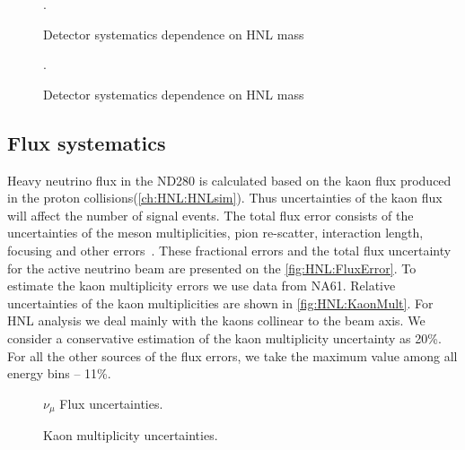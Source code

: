 \documentclass[../main.tex]{subfiles}
\begin{document}
\begin{figure}[!ht]
  \begin{minipage}{0.49\linewidth}
  \end{minipage}
  \begin{minipage}{0.49\linewidth}
  \end{minipage}
  \caption{Detector systematics dependence on HNL mass}.
  \label{fig:HNL:sys}
\end{figure}

\begin{figure}[!ht]
  \caption{Detector systematics dependence on HNL mass}.
  \label{fig:HNL:sysDimuon}
\end{figure}


\subsection{Flux systematics}

Heavy neutrino flux in the ND280 is calculated based on the kaon flux produced in the proton collisions(\autoref{ch:HNL:HNLsim}). Thus uncertainties of the kaon flux will affect the number of signal events. The total flux error consists of the uncertainties of the meson multiplicities, pion re-scatter, interaction length, focusing and other errors~\cite{Abe2013}. These fractional errors and the total flux uncertainty for the active neutrino beam are presented on the \autoref{fig:HNL:FluxError}. To estimate the kaon multiplicity errors we use data from NA61. Relative uncertainties of the kaon multiplicities are shown in \autoref{fig:HNL:KaonMult}. For HNL analysis we deal mainly with the kaons collinear to the beam axis. We consider a conservative estimation of the kaon multiplicity uncertainty as 20\%. For all the other sources of the flux errors, we take the maximum value among all energy bins -- 11\%.

\begin{figure}[!ht]
\begin{minipage}{0.49\linewidth}
  \caption{$\nu_\mu$ Flux uncertainties.}
  \label{fig:HNL:FluxError}
\end{minipage}
\hfill
\begin{minipage}{0.49\linewidth}
  \caption{Kaon multiplicity uncertainties.}
  \label{fig:HNL:KaonMult}
\end{minipage}
\end{figure}
\end{document}
